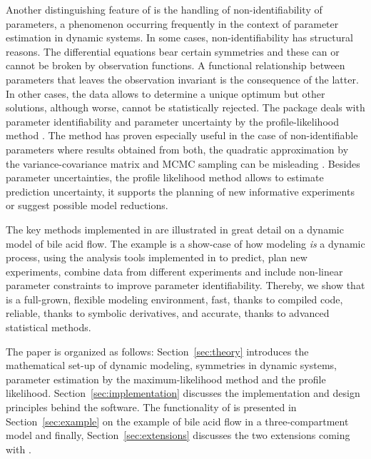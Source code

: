 \documentclass[article]{jss}
\begin{document}
Another distinguishing feature of  is the handling of non-identifiability of parameters, a phenomenon occurring frequently in the context of parameter estimation in dynamic systems.
 In some cases, non-identifiability has structural reasons. The differential equations bear certain symmetries and these can or cannot be broken by observation functions. A functional relationship between parameters that leaves the observation invariant is the consequence of the latter. In other cases, the data allows to determine a unique optimum but other solutions, although worse, cannot be statistically rejected. The  package deals with parameter identifiability and parameter uncertainty by the profile-likelihood method \citep{murphy2000profile, kreutz2013profile}. The method has proven especially useful in the case of non-identifiable parameters where results obtained from both, the quadratic approximation by the variance-covariance matrix and MCMC sampling can be misleading \citep{raue2013joining}. Besides parameter uncertainties, the profile likelihood method allows to estimate prediction uncertainty, it supports the planning of new informative experiments or suggest possible model reductions.

The key methods implemented in  are illustrated in great detail on a dynamic model of bile acid flow. The example is a show-case of how modeling \textit{is} a dynamic process, using the analysis tools implemented in  to predict, plan new experiments, combine data from different experiments and include non-linear parameter constraints to improve parameter identifiability. Thereby, we show that  is a full-grown, flexible modeling environment, fast, thanks to compiled code, reliable, thanks to symbolic derivatives, and accurate, thanks to advanced statistical methods. 

The paper is organized as follows: Section~\ref{sec:theory} introduces the mathematical set-up of dynamic modeling, symmetries in dynamic systems, parameter estimation by the maximum-likelihood method and the profile likelihood. Section~\ref{sec:implementation} discusses the implementation and design principles behind the  software. The functionality of  is presented in Section~\ref{sec:example} on the example of bile acid flow in a three-compartment model and finally, Section~\ref{sec:extensions} discusses the two  extensions coming with .


\end{document}

